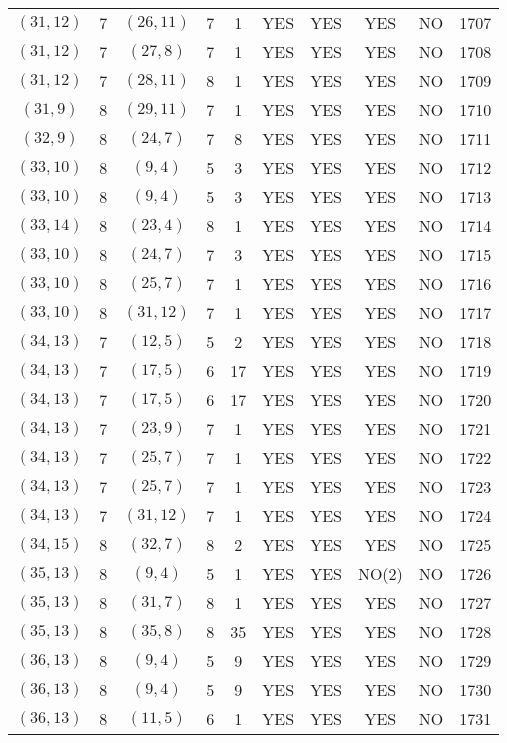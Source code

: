 \begin{longtable}{|c|c|c|c|c|c|c|c|c|c|}
$(31, 12)$ & 7 & $(26, 11)$ & 7 & 1 & YES & YES & YES & NO & 1707\\
$(31, 12)$ & 7 & $(27, 8)$ & 7 & 1 & YES & YES & YES & NO & 1708\\
$(31, 12)$ & 7 & $(28, 11)$ & 8 & 1 & YES & YES & YES & NO & 1709\\
$(31, 9)$ & 8 & $(29, 11)$ & 7 & 1 & YES & YES & YES & NO & 1710\\
$(32, 9)$ & 8 & $(24, 7)$ & 7 & 8 & YES & YES & YES & NO & 1711\\
$(33, 10)$ & 8 & $(9, 4)$ & 5 & 3 & YES & YES & YES & NO & 1712\\
$(33, 10)$ & 8 & $(9, 4)$ & 5 & 3 & YES & YES & YES & NO & 1713\\
$(33, 14)$ & 8 & $(23, 4)$ & 8 & 1 & YES & YES & YES & NO & 1714\\
$(33, 10)$ & 8 & $(24, 7)$ & 7 & 3 & YES & YES & YES & NO & 1715\\
$(33, 10)$ & 8 & $(25, 7)$ & 7 & 1 & YES & YES & YES & NO & 1716\\
$(33, 10)$ & 8 & $(31, 12)$ & 7 & 1 & YES & YES & YES & NO & 1717\\
$(34, 13)$ & 7 & $(12, 5)$ & 5 & 2 & YES & YES & YES & NO & 1718\\
$(34, 13)$ & 7 & $(17, 5)$ & 6 & 17 & YES & YES & YES & NO & 1719\\
$(34, 13)$ & 7 & $(17, 5)$ & 6 & 17 & YES & YES & YES & NO & 1720\\
$(34, 13)$ & 7 & $(23, 9)$ & 7 & 1 & YES & YES & YES & NO & 1721\\
$(34, 13)$ & 7 & $(25, 7)$ & 7 & 1 & YES & YES & YES & NO & 1722\\
$(34, 13)$ & 7 & $(25, 7)$ & 7 & 1 & YES & YES & YES & NO & 1723\\
$(34, 13)$ & 7 & $(31, 12)$ & 7 & 1 & YES & YES & YES & NO & 1724\\
$(34, 15)$ & 8 & $(32, 7)$ & 8 & 2 & YES & YES & YES & NO & 1725\\
$(35, 13)$ & 8 & $(9, 4)$ & 5 & 1 & YES & YES & NO(2) & NO & 1726\\
$(35, 13)$ & 8 & $(31, 7)$ & 8 & 1 & YES & YES & YES & NO & 1727\\
$(35, 13)$ & 8 & $(35, 8)$ & 8 & 35 & YES & YES & YES & NO & 1728\\
$(36, 13)$ & 8 & $(9, 4)$ & 5 & 9 & YES & YES & YES & NO & 1729\\
$(36, 13)$ & 8 & $(9, 4)$ & 5 & 9 & YES & YES & YES & NO & 1730\\
$(36, 13)$ & 8 & $(11, 5)$ & 6 & 1 & YES & YES & YES & NO & 1731\\

\end{longtable}
